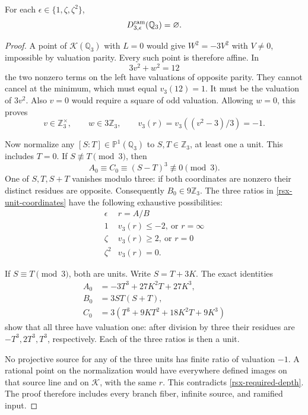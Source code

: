\begin{theorem}
\label{rsx-local-empty}
For each \(\epsilon\in\{1,\zeta,\zeta^2\}\),
\[
 D^{\rm ram}_{3,\epsilon}(\mathbb Q_3)=\varnothing .
\]
\end{theorem}
\begin{proof}
A point of \(\mathcal K(\mathbb Q_3)\) with \(L=0\)
would give \(W^2=-3V^2\) with \(V\ne0\), impossible by
valuation parity. Every such point is therefore affine.
In
\[
 3v^2+w^2=12
\]
the two nonzero terms on the left have valuations of opposite
parity. They cannot cancel at the minimum, which must equal
\(v_3(12)=1\). It must be the valuation of \(3v^2\).
Also \(v=0\) would require a square of odd valuation.
Allowing \(w=0\), this proves
\begin{equation}
 v\in\mathbb Z_3^\times,\qquad w\in3\mathbb Z_3,
 \qquad v_3(r)=v_3((v^2-3)/3)=-1.
 \label{rsx-required-depth}
\end{equation}

Now normalize any \([S:T]\in\mathbb P^1(\mathbb Q_3)\)
to \(S,T\in\mathbb Z_3\), at least one a unit. This includes
\(T=0\). If \(S\not\equiv T\pmod3\), then
\[
 A_0\equiv C_0\equiv(S-T)^3\not\equiv0\pmod3.
\]
One of \(S,T,S+T\) vanishes modulo three: if both coordinates
are nonzero their distinct residues are opposite. Consequently
\(B_0\in9\mathbb Z_3\). The three ratios in
\eqref{rsx-unit-coordinates} have the following exhaustive
possibilities:
\begin{equation}
\begin{array}{c|c}
\epsilon& r=A/B\\ \hline
1&v_3(r)\le-2,\ \text{or }r=\infty\\
\zeta&v_3(r)\ge2,\ \text{or }r=0\\
\zeta^2&v_3(r)=0 .
\end{array}
\label{rsx-unit-depths}
\end{equation}

If \(S\equiv T\pmod3\), both are units. Write \(S=T+3K\).
The exact identities
\begin{align}
 A_0&=-3T^3+27K^2T+27K^3,\nonumber\\
 B_0&=3ST(S+T),\nonumber\\
 C_0&=3(T^3+9KT^2+18K^2T+9K^3)
 \label{rsx-diagonal-expansion}
\end{align}
show that all three have valuation one: after division by three
their residues are \(-T^3,2T^3,T^3\), respectively.
Each of the three ratios is then a unit.

No projective source for any of the three units has finite ratio
of valuation \(-1\). A rational point on the normalization would
have everywhere defined images on that source line and on
\(\mathcal K\), with the same \(r\). This contradicts
\eqref{rsx-required-depth}. The proof therefore includes every
branch fiber, infinite source, and ramified input.
\end{proof}

